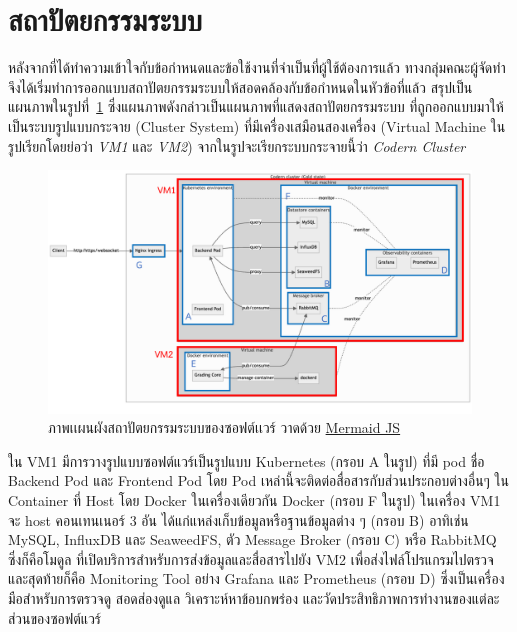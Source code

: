 \documentclass[12pt,one side,openright,a4paper]{cpe-thesis-th}
\newcommand{\thaijustify}[1]{%
  \par\hspace{30pt}\justifying
  #1
}
\begin{document}
\section{สถาปัตยกรรมระบบ}
\thaijustify{
  หลังจากที่ได้ทำความเข้าใจกับข้อกำหนดและข้อใช้งานที่จำเป็นที่ผู้ใช้ต้องการแล้ว ทางกลุ่มคณะผู้จัดทำจึงได้เริ่มทำการออกแบบสถาปัตยกรรมระบบให้สอดคล้องกับข้อกำหนดในหัวข้อที่แล้ว สรุปเป็นแผนภาพในรูปที่~\ref{fig:arch} ซึ่งแผนภาพดังกล่าวเป็นแผนภาพที่แสดงสถาปัตยกรรมระบบ ที่ถูกออกแบบมาให้เป็นระบบรูปแบบกระจาย (Cluster System) ที่มีเครื่องเสมือนสองเครื่อง (Virtual Machine ในรูปเรียกโดยย่อว่า \textit{VM1} และ \textit{VM2}) จากในรูปจะเรียกระบบกระจายนี้ว่า \textit{Codern Cluster}
}
\begin{figure}[!h]
  \centering
  \includegraphics[width=15cm]{figure/diagram/architecture-v1.png}
  \caption[ภาพเเผนผังสถาปัตยกรรมระบบของซอฟต์เเวร์]{ภาพเเผนผังสถาปัตยกรรมระบบของซอฟต์เเวร์ วาดด้วย \href{https://mermaid.js.org/}{Mermaid JS}}\label{fig:arch}
\end{figure}
\thaijustify{
  ใน VM1 มีการวางรูปแบบซอฟต์แวร์เป็นรูปแบบ Kubernetes (กรอบ A ในรูป) ที่มี pod ชื่อ Backend Pod และ Frontend Pod โดย Pod เหล่านี้จะติดต่อสื่อสารกับส่วนประกอบต่างอื่นๆ ใน Container ที่ Host โดย Docker ในเครื่องเดียวกัน Docker (กรอบ F ในรูป) ในเครื่อง VM1 จะ host คอนเทนเนอร์ 3 อัน ได้แก่แหล่งเก็บข้อมูลหรือฐานข้อมูลต่าง ๆ (กรอบ B) อาทิเช่น MySQL, InfluxDB และ SeaweedFS, ตัว Message Broker (กรอบ C) หรือ RabbitMQ ซึ่งก็คือโมดูล ที่เปิดบริการสำหรับการส่งข้อมูลและสื่อสารไปยัง VM2 เพื่อส่งไฟล์โปรแกรมไปตรวจ และสุดท้ายก็คือ Monitoring Tool อย่าง Grafana และ Prometheus (กรอบ D) ซึ่งเป็นเครื่องมือสำหรับการตรวจดู สอดส่องดูแล วิเคราะห์หาข้อบกพร่อง และวัดประสิทธิภาพการทำงานของแต่ละส่วนของซอฟต์แวร์
}
\end{document}
